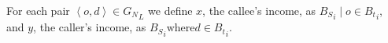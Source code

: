 For each pair \( \left< o, d \right> \in {G_N}_L \) we define \( x \), the callee's income, as \( {B_S}_i \mid o \in {B_t}_i \), and \( y \), the caller's income, as \( {B_S}_i \text{where} d \in {B_t}_i \).